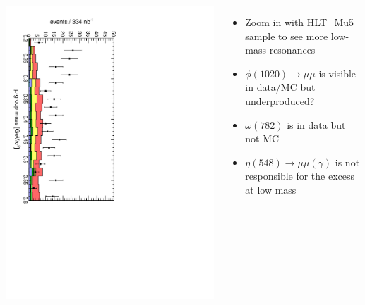 \documentclass[compress]{beamer}
\begin{document}
\begin{frame}
\begin{columns}
\includegraphics[height=\linewidth, angle=90]{Mu5_mass_eta.pdf}

\begin{itemize}
\item Zoom in with HLT\_Mu5 sample to see more low-mass resonances

\item $\phi(1020) \to \mu\mu$ is visible in data/MC but underproduced?

\item $\omega(782)$ is in data but not MC

\item $\eta(548) \to \mu\mu(\gamma)$ is not responsible for the excess at low mass
\end{itemize}


\end{columns}
\end{frame}
\end{document}

